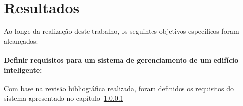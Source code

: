 \section{Resultados}

% 
% 
% 
% 

Ao longo da realização deste trabalho, os seguintes objetivos específicos foram alcançados:

\paragraph{Definir requisitos para um sistema de gerenciamento de um edifício inteligente:}
Com base na revisão bibliográfica realizada, foram definidos os requisitos do sistema apresentado no capítulo~\ref{} 